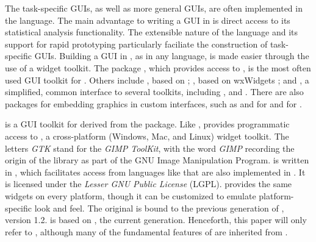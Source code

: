 \documentclass[article]{jss}
\begin{document}
The task-specific GUIs, as well as more general  GUIs,
are often implemented in the  language. The main advantage
to 
writing a GUI in  is direct access to its statistical
analysis
functionality. The extensible nature of the  language and
its support 
for rapid prototyping particularly faciliate the construction of
task-specific GUIs.
Building a GUI in , as in any language, is made easier
through the use of a 
widget toolkit. The  package \citep{Rnews:Dalgaard:2001a,
Rnews:Dalgaard:2002},
which provides access to  \citep{ousterhout,welch}, is the
most often 
used GUI toolkit for . Others include 
\citep{RGtk}, based
on  \citep{GTK};  \citep{RwxWidgets}, based
on
wxWidgets \citep{wxwidgets}; and  \citep{gWidgets}, a
simplified, common interface to several toolkits, including
, 
and  . There are also packages for embedding
graphics in custom interfaces, such as 
\citep{gtkDevice} 
and  \citep{cairoDevice} for  and
\citep{tkrplot} for .

 is a GUI toolkit for  derived from the
 package.
Like ,  provides programmatic access to
, 
a cross-platform (Windows, Mac, and Linux) widget toolkit. 
The letters \emph{GTK} stand for the \emph{GIMP ToolKit}, with the
word \emph{GIMP} recording the origin of the library as part of the
GNU Image Manipulation Program.  is written in ,
which
facilitates access from languages like  that are also
implemented 
in . It is licensed under the \emph{Lesser GNU Public
License} (LGPL).
 provides the same widgets on every platform, though it can
be customized to emulate platform-specific look and feel. The original
 is bound to the previous generation of , version
1.2.  is based on , the current
generation. Henceforth, this paper will only refer to ,
although many of the fundamental features of  are inherited
from .
\end{document}
